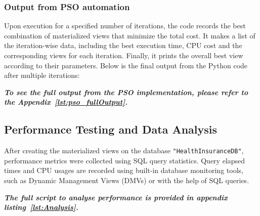 \subsubsection{Output from PSO automation }  Upon execution for a specified number of iterations, the code records the best combination of materialized views that minimize the total cost. It makes a list of the iteration-wise data, including the best execution time, CPU cost and the corresponding views for each iteration. Finally, it prints the overall best view according to their parameters. Below is the final output from the Python code after multiple iterations: \vspace{.4cm}



   \vspace{.4cm}
  


  

\textit{\textbf{To see the full output from the PSO implementation, please refer to the Appendix~\ref{lst:pso_fullOutput}.}}\vspace{.4cm}


\subsection{Performance Testing and Data Analysis} After creating the materialized views on the database \texttt{"HealthInsuranceDB"}, performance metrics were collected using SQL query statistics. Query elapsed times and CPU usages are recorded using built-in database monitoring tools, such as Dynamic Management Views (DMVs) or with the help of SQL queries. \vspace{.4cm}

  \vspace{.4cm}

\textit{\textbf{The full script to analyse performance is provided in appendix listing~\ref{lst:Analysis}.}} \vspace{.4cm}

